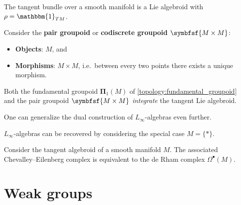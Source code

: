     \begin{example}
        The tangent bundle over a smooth manifold is a Lie algebroid with $\rho=\mathbbm{1}_{TM}$.

        Consider the \textbf{pair groupoid} or \textbf{codiscrete groupoid} $\symbfsf{M\times M}$:
        \begin{itemize}
            \item\textbf{Objects}: $M$, and
            \item\textbf{Morphisms}: $M\times M$, i.e.~between every two points there exists a unique morphism.
        \end{itemize}
        Both the fundamental groupoid $\symbf{\Pi}_1(M)$ of \cref{topology:fundamental_groupoid} and the pair groupoid $\symbfsf{M\times M}$ \textit{integrate} the tangent Lie algebroid.
    \end{example}


    One can generalize the dual construction of $L_\infty$-algebras even further.
    \begin{property}
        $L_\infty$-algebras can be recovered by considering the special case $M=\{\ast\}$.
    \end{property}

    \begin{example}
        Consider the tangent algebroid of a smooth manifold $M$. The associated Chevalley--Eilenberg complex is equivalent to the de Rham complex $\Omega^\bullet(M)$.
    \end{example}

\section{Weak groups}

